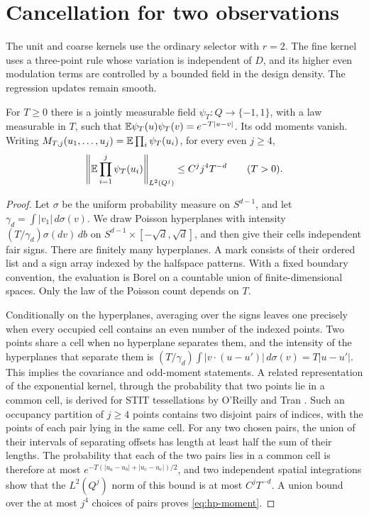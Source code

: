 \section{Cancellation for two observations}\label{sec:pair-new}

The unit and coarse kernels use the ordinary selector with $r=2$.
The fine kernel uses a three-point rule whose variation is independent
of $D$, and its higher even modulation terms are controlled by a
bounded field in the design density. The regression updates remain
smooth.

\begin{lemma}\label{lem:hyperplane}
For $T\ge0$ there is a jointly measurable field $\psi_T:Q\to\{-1,1\}$,
with a law measurable in $T$, such that
$\mathbb E\psi_T(u)\psi_T(v)=e^{-T|u-v|}$. Its odd moments vanish. Writing
$M_{T,j}(u_1,\ldots,u_j)=\mathbb E\prod_i\psi_T(u_i)$, for every even $j\ge4$,
\begin{equation}\label{eq:hp-moment}
 \left\|\mathbb E\prod_{i=1}^j\psi_T(u_i)\right\|_{L^2(Q^j)}
 \le C^j j^4T^{-d}\qquad(T>0).
\end{equation}
\end{lemma}

\begin{proof}
Let $\sigma$ be the uniform probability measure on $S^{d-1}$, and let
$\gamma_d=\int|v_1|\,d\sigma(v)$. We draw Poisson hyperplanes
\cite[Section~12.4]{LastPenrose2018} with
intensity $(T/\gamma_d)\sigma(dv)\,db$ on
$S^{d-1}\times[-\sqrt d,\sqrt d]$, and then give their cells
independent fair signs. There are finitely many hyperplanes. A mark
consists of their ordered list and a sign array indexed by the
halfspace patterns. With a fixed boundary convention, the evaluation
is Borel on a countable union of finite-dimensional spaces. Only the
law of the Poisson count depends on $T$.

Conditionally on the hyperplanes, averaging over the signs leaves one
precisely when every occupied cell contains an even number of the
indexed points. Two points share a cell when no hyperplane separates
them, and the intensity of the hyperplanes that separate them is
$(T/\gamma_d)\int|v\cdot(u-u')|\,d\sigma(v)=T|u-u'|$.
This implies the covariance and odd-moment statements. A related
representation of the exponential kernel, through the probability that
two points lie in a common cell, is derived for STIT tessellations by
O'Reilly and Tran \cite[Section~4.1, Theorem~4.1]{OReillyTran2022}.
Such an occupancy partition of $j\ge4$ points contains two disjoint
pairs of indices, with the points of each pair lying in the same cell. For any two chosen pairs, the union of their intervals of
separating offsets has length at least half the sum of their lengths.
The probability that each of the two pairs lies in a common cell is
therefore at most $e^{-T(|u_a-u_b|+|u_c-u_e|)/2}$, and two independent
spatial integrations show that the $L^2(Q^j)$ norm of this bound is at
most $C^jT^{-d}$. A union bound over the at most $j^4$ choices of
pairs proves \eqref{eq:hp-moment}.
\end{proof}

